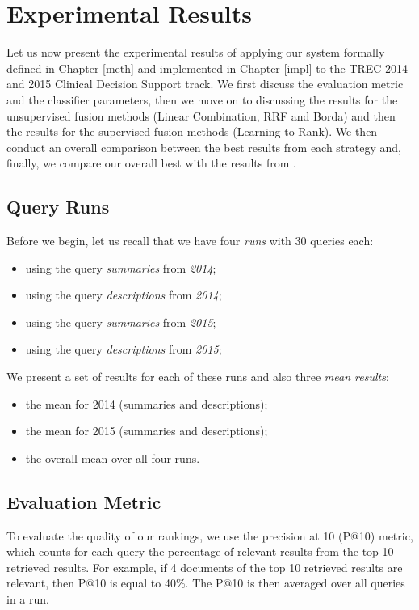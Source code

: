 \chapter{Experimental Results}\label{exp}

Let us now present the experimental results of applying our system formally defined in Chapter \ref{meth} and implemented in Chapter
\ref{impl}
to the TREC 2014 and 2015 Clinical Decision Support track.
We first discuss the evaluation metric and the classifier parameters,
then we move on to discussing the results for the unsupervised fusion methods (Linear Combination, RRF and Borda)
and then the results for the supervised fusion methods (Learning to Rank). We then conduct an overall comparison between the best results from each strategy
and, finally, we compare our overall best with the results from \cite{choi}.

\section{Query Runs}\label{runs} Before we begin, let us recall that we have four \emph{runs} with 30 queries each:
\begin{itemize}
 \item using the query \emph{summaries} from \emph{2014};
 \item using the query \emph{descriptions} from \emph{2014};
 \item using the query \emph{summaries} from \emph{2015};
 \item using the query \emph{descriptions} from \emph{2015};
\end{itemize}

We present a set of results for each of these runs and also three \emph{mean results}:
\begin{itemize}
 \item the mean for 2014 (summaries and descriptions);
 \item the mean for 2015 (summaries and descriptions);
 \item the overall mean over all four runs.
\end{itemize}

\section{Evaluation Metric}
To evaluate the quality of our rankings, we use the precision at 10 (P@10) metric, which counts for each query the percentage of
relevant results from the top 10 retrieved results. For example, if 4 documents of the top 10 retrieved results are relevant,
then P@10 is equal to 40\%. The P@10 is then averaged over all queries in a run.

